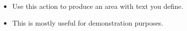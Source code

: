 
\begin{itemize}
\item Use this action to produce an area with text you define. 
\item This is mostly useful for demonstration purposes. 
\end{itemize}
